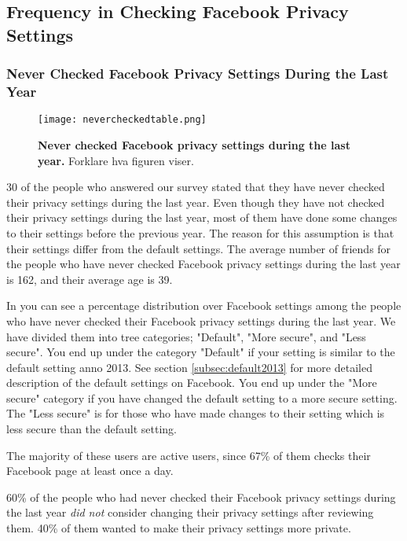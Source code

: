 \subsection{Frequency in Checking Facebook Privacy Settings}

\subsubsection{Never Checked Facebook Privacy Settings During the Last Year}

\begin{figure}[h!]
\centering
\texttt{[image: nevercheckedtable.png]}
\caption[Never checked Facebook privacy settings during the last year]{\textbf{Never checked Facebook privacy settings during the last year.} Forklare hva figuren viser.} 
\label{fig:neverchecked}
\end{figure}

30 of the people who answered our survey stated that they have never checked their privacy settings during the last year. Even though they have not checked their privacy settings during the last year, most of them have done some changes to their settings before the previous year. The reason for this assumption is that their settings differ from the default settings.  
The average number of friends for the people who have never checked Facebook privacy settings during the last year is 162, and their average age is 39. 

In  you can see a percentage distribution over Facebook settings among the people who have never checked their Facebook privacy settings during the last year. We have divided them into tree categories; "Default", "More secure", and "Less secure". You end up under the category "Default" if your setting is similar to the default setting anno 2013. See section \ref{subsec:default2013} for more detailed description of the default settings on Facebook. You end up under the "More secure" category if you have changed the default setting to a more secure setting. The "Less secure" is for those who have made changes to their setting which is less secure than the default setting. 

The majority of these users are active users, since 67\% of them checks their Facebook page at least once a day. 

60\% of the people who had never checked their Facebook privacy settings during the last year \textit{did not} consider changing their privacy settings after reviewing them. 40\% of them wanted to make their privacy settings more private. 

